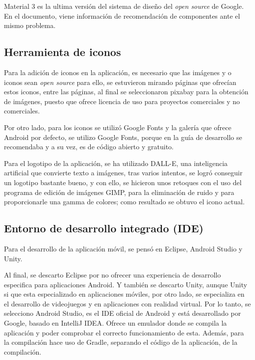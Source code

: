         Material 3 es la ultima versión del sistema de diseño del \textit{open source} de Google.
        En el documento, viene información de recomendación de componentes ante el mismo problema.

    \subsection{Herramienta de iconos}
        Para la adición de iconos en la aplicación, es necesario que las imágenes y o iconos sean \textit{open source} para ello, se estuvieron mirando páginas que ofrecían estos iconos, entre las páginas, al final se seleccionaron pixabay para la obtención de imágenes, puesto que ofrece licencia de uso para proyectos comerciales y no comerciales.

        Por otro lado, para los iconos se utilizó Google Fonts y la galería que ofrece Android por defecto, se utilizo Google Fonts, porque en la guía de desarrollo se recomendaba y a su vez, es de código abierto y gratuito.

        Para el logotipo de la aplicación, se ha utilizado DALL-E, una inteligencia artificial que convierte texto a imágenes, tras varios intentos, se logró conseguir un logotipo bastante bueno, y con ello, se hicieron unos retoques con el uso del programa de edición de imágenes GIMP, para la eliminación de ruido y para proporcionarle una gamma de colores; como resultado se obtuvo el icono actual.

    \subsection{Entorno de desarrollo integrado (IDE)}
        Para el desarrollo de la aplicación móvil, se pensó en Eclipse, Android Studio y Unity.

        Al final, se descarto Eclipse por no ofrecer una experiencia de desarrollo especifica para aplicaciones Android. Y también se descarto Unity, aunque Unity si que esta especializado en aplicaciones móviles, por otro lado, se especializa en el desarrollo de videojuegos y en aplicaciones con realidad virtual.
        Por lo tanto, se selecciono Android Studio, es el IDE oficial de Android y está desarrollado por Google, basado en IntelliJ IDEA. Ofrece un emulador donde se compila la aplicación y poder comprobar el correcto funcionamiento de esta.
        Además, para la compilación hace uso de Gradle, separando el código de la aplicación, de la compilación.

